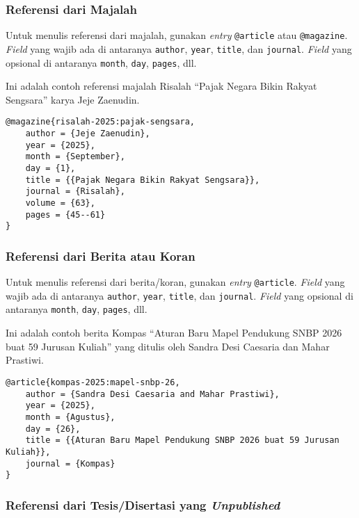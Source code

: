 \subsubsection{Referensi dari Majalah}

Untuk menulis referensi dari majalah, gunakan \textit{entry} \texttt{@article} atau \texttt{@magazine}. \textit{Field} yang wajib ada di antaranya \texttt{author}, \texttt{year}, \texttt{title}, dan \texttt{journal}. \textit{Field} yang opsional di antaranya \texttt{month}, \texttt{day}, \texttt{pages}, dll.

Ini adalah contoh referensi majalah Risalah ``Pajak Negara Bikin Rakyat Sengsara'' karya Jeje Zaenudin.

\begin{lstlisting}
@magazine{risalah-2025:pajak-sengsara,
    author = {Jeje Zaenudin},
    year = {2025},
    month = {September},
    day = {1},
    title = {{Pajak Negara Bikin Rakyat Sengsara}},
    journal = {Risalah},
    volume = {63},
    pages = {45--61}
}
\end{lstlisting}

\subsubsection{Referensi dari Berita atau Koran}

Untuk menulis referensi dari berita/koran, gunakan \textit{entry} \texttt{@article}. \textit{Field} yang wajib ada di antaranya \texttt{author}, \texttt{year}, \texttt{title}, dan \texttt{journal}. \textit{Field} yang opsional di antaranya \texttt{month}, \texttt{day}, \texttt{pages}, dll.

Ini adalah contoh berita Kompas ``Aturan Baru Mapel Pendukung SNBP 2026 buat 59 Jurusan Kuliah'' yang ditulis oleh Sandra Desi Caesaria dan Mahar Prastiwi.

\begin{lstlisting}
@article{kompas-2025:mapel-snbp-26,
    author = {Sandra Desi Caesaria and Mahar Prastiwi},
    year = {2025},
    month = {Agustus},
    day = {26},
    title = {{Aturan Baru Mapel Pendukung SNBP 2026 buat 59 Jurusan Kuliah}},
    journal = {Kompas}
}
\end{lstlisting}

\subsubsection{Referensi dari Tesis/Disertasi yang \textit{Unpublished}}

